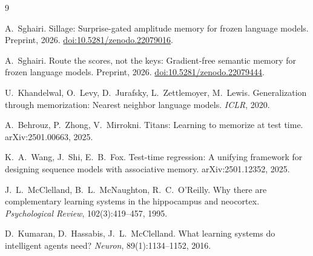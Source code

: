 \documentclass[11pt]{article}
\begin{document}
\begin{thebibliography}{9}\small

 A.~Sghairi. Sillage: Surprise-gated amplitude memory for frozen language models. Preprint, 2026. \href{https://doi.org/10.5281/zenodo.22079016}{doi:10.5281/zenodo.22079016}.

 A.~Sghairi. Route the scores, not the keys: Gradient-free semantic memory for frozen language models. Preprint, 2026. \href{https://doi.org/10.5281/zenodo.22079444}{doi:10.5281/zenodo.22079444}.

 U.~Khandelwal, O.~Levy, D.~Jurafsky, L.~Zettlemoyer, M.~Lewis. Generalization through memorization: Nearest neighbor language models. \emph{ICLR}, 2020.

 A.~Behrouz, P.~Zhong, V.~Mirrokni. Titans: Learning to memorize at test time. arXiv:2501.00663, 2025.

 K.~A.~Wang, J.~Shi, E.~B.~Fox. Test-time regression: A unifying framework for designing sequence models with associative memory. arXiv:2501.12352, 2025.

 J.~L.~McClelland, B.~L.~McNaughton, R.~C.~O'Reilly. Why there are complementary learning systems in the hippocampus and neocortex. \emph{Psychological Review}, 102(3):419--457, 1995.

 D.~Kumaran, D.~Hassabis, J.~L.~McClelland. What learning systems do intelligent agents need? \emph{Neuron}, 89(1):1134--1152, 2016.

\end{thebibliography}
\end{document}
